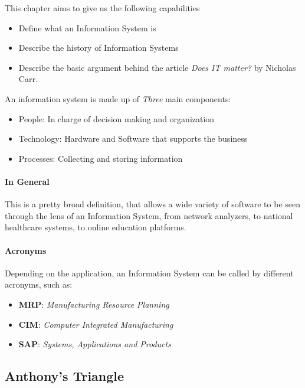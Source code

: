 \documentclass[openright, twoside, twocolumn]{report}
\begin{document}
    This chapter aims to give us the following capabilities

    \begin{itemize}
      \item Define what an Information System is
      \item Describe the history of Information Systems
      \item Describe the basic argument behind the article \emph{Does IT matter?} by Nicholas Carr. 
    \end{itemize}

    An information system is made up of \emph{Three} main components:

    \begin{itemize}
      \item People: In charge of decision making and organization
      \item Technology: Hardware and Software that supports the business
      \item Processes: Collecting and storing information
    \end{itemize}

    \paragraph{In General} 
    This is a pretty broad definition, that allows a wide variety of software to be seen through the lens of an Information System, 
    from network analyzers, to national healthcare systems, to online education platforms.

    \paragraph{Acronyms} 
    Depending on the application, an Information System can be called by different acronyms, such as:

    \begin{itemize}
      \item \textbf{MRP}: \emph{Manufacturing Resource Planning}
      \item \textbf{CIM}: \emph{Computer Integrated Manufacturing}
      \item \textbf{SAP}: \emph{Systems, Applications and Products}
    \end{itemize}
    
    \subsection{Anthony's Triangle} 
    
\end{document}
